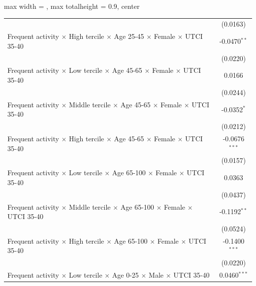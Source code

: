 \begin{table}[htbp]
\begin{adjustbox}{max width = \textwidth, max totalheight = 0.9\textheight, center}
\begin{tabular}{lc}
                                                                                                               & (0.0163)\\   
         Frequent activity $\times$ High tercile $\times$ Age 25-45 $\times$ Female $\times$ UTCI 35-40        & -0.0470$^{**}$\\   
                                                                                                               & (0.0220)\\   
         Frequent activity $\times$ Low tercile $\times$ Age 45-65 $\times$ Female $\times$ UTCI 35-40         & 0.0166\\   
                                                                                                               & (0.0244)\\   
         Frequent activity $\times$ Middle tercile $\times$ Age 45-65 $\times$ Female $\times$ UTCI 35-40      & -0.0352$^{*}$\\   
                                                                                                               & (0.0212)\\   
         Frequent activity $\times$ High tercile $\times$ Age 45-65 $\times$ Female $\times$ UTCI 35-40        & -0.0676$^{***}$\\   
                                                                                                               & (0.0157)\\   
         Frequent activity $\times$ Low tercile $\times$ Age 65-100 $\times$ Female $\times$ UTCI 35-40        & 0.0363\\   
                                                                                                               & (0.0437)\\   
         Frequent activity $\times$ Middle tercile $\times$ Age 65-100 $\times$ Female $\times$ UTCI 35-40     & -0.1192$^{**}$\\   
                                                                                                               & (0.0524)\\   
         Frequent activity $\times$ High tercile $\times$ Age 65-100 $\times$ Female $\times$ UTCI 35-40       & -0.1400$^{***}$\\   
                                                                                                               & (0.0220)\\   
         Frequent activity $\times$ Low tercile $\times$ Age 0-25 $\times$ Male $\times$ UTCI 35-40            & 0.0460$^{***}$\\   

\end{tabular}
\end{adjustbox}
\end{table}
